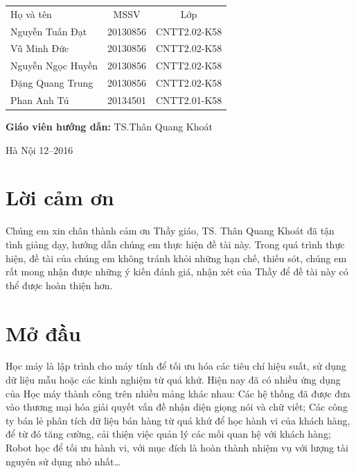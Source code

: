 \documentclass[a4paper,12pt]{report}
\renewcommand{\contentsname}{Mục lục}
\begin{document}
\begin{longtable}{l c c}

Họ và tên & MSSV  & Lớp\\
Nguyễn Tuấn Đạt & 20130856 & CNTT2.02-K58 \\
Vũ Minh Đức & 20130856 & CNTT2.02-K58 \\
Nguyễn Ngọc Huyền & 20130856 & CNTT2.02-K58 \\
Đặng Quang Trung & 20130856 & CNTT2.02-K58 \\
Phan Anh Tú & 20134501 & CNTT2.01-K58 \\

\end{longtable}

\hspace{1cm}\fontsize{14}{16}\selectfont \textbf{Giáo viên hướng dẫn: }TS.Thân Quang Khoát \\[1.5cm]
\begin{center}
\fontsize{16}{19}\selectfont Hà Nội 12--2016

\end{center}
\newpage
\pdfbookmark{\contentsname}{toc}
\tableofcontents
\chapter*{Lời cảm ơn}
Chúng em xin chân thành cảm ơn Thầy giáo, TS. Thân Quang Khoát đã tận tình giảng dạy, hướng dẫn chúng em thực hiện đề tài này. Trong quá trình thực hiện, đề tài của chúng em không tránh khỏi những hạn chế, thiếu sót, chúng em rất mong nhận được những ý kiến đánh giá, nhận xét của Thầy để đề tài này có thể được hoàn thiện hơn.
{}

\listoffigures
\chapter{Mở đầu}
Học máy là lập trình cho máy tính để tối ưu hóa các tiêu chí hiệu suất, sử dụng dữ liệu mẫu hoặc các kinh nghiệm từ quá khứ. Hiện nay đã có nhiều ứng dụng của Học máy thành công trên nhiều mảng khác nhau: Các hệ thống đã được đưa vào thương mại hóa giải quyết vấn đề nhận diện giọng nói và chữ viết; Các công ty bán lẻ phân tích dữ liệu bán hàng từ quá khứ để học hành vi của khách hàng, để từ đó tăng cường, cải thiện việc quản lý các mối quan hệ với khách hàng; Robot học để tối ưu hành vi, với mục đích là hoàn thành nhiệm vụ với lượng tài nguyên sử dụng nhỏ nhất… \\
\end{document}
